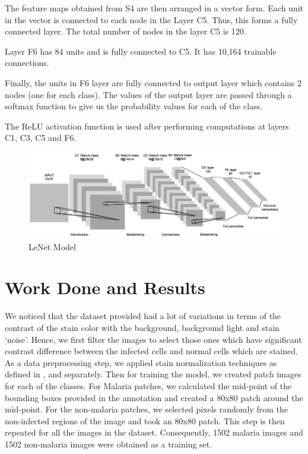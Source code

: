 \documentclass{nitk}
\begin{document}
The feature maps obtained from S4 are then arranged in a vector form. Each unit in the vector is connected to each node in the Layer C5. Thus, this forms a fully connected layer. The total number of nodes in the layer C5 is 120. \\ \par

Layer F6 has 84 units and is fully connected to C5. It has 10,164 trainable connections. \\ \par

Finally, the units in F6 layer are fully connected to output layer which contains 2 nodes (one for each class). The values of the output layer are passed through a softmax function to give us the probability values for each of the class. \\ \par

The ReLU activation function is used after performing computations at layers C1, C3, C5 and F6.

\begin{figure}
        \centering
        \includegraphics[width=\linewidth]{images/LeNet.png}
        \caption{LeNet Model}
        \label{LeNet}
\end{figure}
    
\newpage
\section{Work Done and Results}
    
We noticed that the dataset provided had a lot of variations in terms of the contrast of the stain color with the background, background light and stain `noise'. Hence, we first filter the images to select those ones which have significant contrast difference between the infected cells and normal cells which are stained. As a data preprocessing step, we applied stain normalization techniques as defined in \cite{macenko2009method}, \cite{reinhard2001color} and \cite{} separately. Then for training the model, we created patch images for each of the classes. For Malaria patches, we calculated the mid-point of the bounding boxes provided in the annotation and created a 80x80 patch around the mid-point. For the non-malaria patches, we selected pixels randomly from the non-infected regions of the image and took an 80x80 patch. This step is then repeated for all the images in the dataset. Consequently, 1502 malaria images and 1502 non-malaria images were obtained as a training set.  \\ \par
\end{document}
